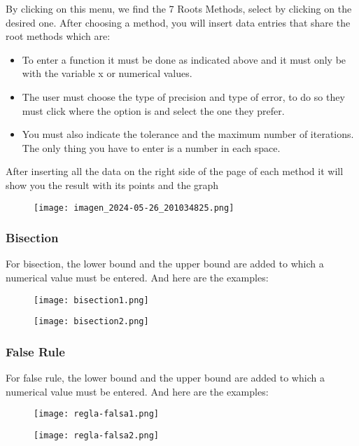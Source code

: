 \documentclass{uofa-eng-assignment}
\begin{document}
By clicking on this menu, we find the 7 Roots Methods, select by clicking on the desired one. After choosing a method, you will insert data entries that share the root methods which are:
\begin{itemize}
\item To enter a function it must be done as indicated above and it must only be with the variable x or numerical values.
      \item The user must choose the type of precision and type of error, to do so they must click where the option is and select the one they prefer.
      \item You must also indicate the tolerance and the maximum number of iterations. The only thing you have to enter is a number in each space.
    \end{itemize}
        
After inserting all the data on the right side of the page of each method it will show you the result with its points and the graph
\begin{figure}[H]
    \centering
    \texttt{[image: imagen\_2024-05-26\_201034825.png]}
\end{figure}
 
\subsubsection{Bisection}
For bisection, the lower bound and the upper bound are added to which a numerical value must be entered. And here are the examples:

\begin{figure}[H]
    \centering
    \texttt{[image: bisection1.png]}
\end{figure}

\begin{figure}[H]
    \centering
    \texttt{[image: bisection2.png]}
\end{figure}
\subsubsection{False Rule}
For false rule, the lower bound and the upper bound are added to which a numerical value must be entered. And here are the examples:
\begin{figure}[H]
    \centering
    \texttt{[image: regla-falsa1.png]}
\end{figure}
\begin{figure}[H]
    \centering
    \texttt{[image: regla-falsa2.png]}
\end{figure}
\end{document}
